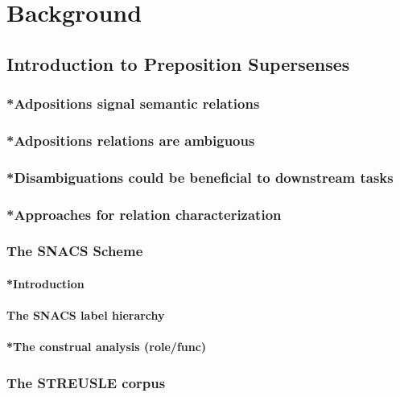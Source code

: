 
\chapter{Background} %

\label{Background} %


\section{Introduction to Preposition Supersenses}
\subsection{*Adpositions signal semantic relations}
\subsection{*Adpositions relations are ambiguous}
\subsection{*Disambiguations could be beneficial to downstream tasks}
\subsection{*Approaches for relation characterization}
\subsection{The SNACS Scheme}
\subsubsection{*Introduction}
\subsubsection{The SNACS label hierarchy}
\subsubsection{*The construal analysis (role/func)}
\subsection{The STREUSLE corpus}
